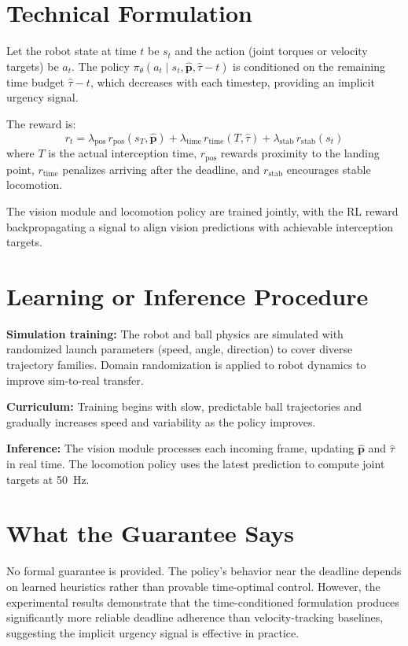 \documentclass[10pt,twocolumn]{article}
\begin{document}
\section{Technical Formulation}

Let the robot state at time $t$ be $s_t$ and the action (joint torques or velocity
targets) be $a_t$. The policy $\pi_\theta(a_t \mid s_t, \hat{\mathbf{p}}, \hat{\tau} - t)$
is conditioned on the remaining time budget $\hat{\tau} - t$, which decreases with
each timestep, providing an implicit urgency signal.

The reward is:
\[
r_t = \lambda_{\mathrm{pos}}\,r_{\mathrm{pos}}(s_T, \hat{\mathbf{p}})
    + \lambda_{\mathrm{time}}\,r_{\mathrm{time}}(T, \hat{\tau})
    + \lambda_{\mathrm{stab}}\,r_{\mathrm{stab}}(s_t)
\]
where $T$ is the actual interception time, $r_{\mathrm{pos}}$ rewards proximity
to the landing point, $r_{\mathrm{time}}$ penalizes arriving after the deadline,
and $r_{\mathrm{stab}}$ encourages stable locomotion.

The vision module and locomotion policy are trained jointly, with the RL reward
backpropagating a signal to align vision predictions with achievable interception
targets.

\section{Learning or Inference Procedure}

\textbf{Simulation training:} The robot and ball physics are simulated with
randomized launch parameters (speed, angle, direction) to cover diverse
trajectory families. Domain randomization is applied to robot dynamics to
improve sim-to-real transfer.

\textbf{Curriculum:} Training begins with slow, predictable ball trajectories
and gradually increases speed and variability as the policy improves.

\textbf{Inference:} The vision module processes each incoming frame, updating
$\hat{\mathbf{p}}$ and $\hat{\tau}$ in real time. The locomotion policy uses
the latest prediction to compute joint targets at 50~Hz.

\section{What the Guarantee Says}

No formal guarantee is provided. The policy's behavior near the deadline depends
on learned heuristics rather than provable time-optimal control. However, the
experimental results demonstrate that the time-conditioned formulation produces
significantly more reliable deadline adherence than velocity-tracking baselines,
suggesting the implicit urgency signal is effective in practice.
\end{document}
